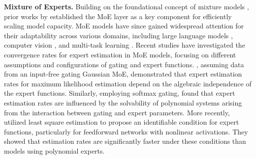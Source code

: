 \textbf{Mixture of Experts.} Building on the foundational concept of mixture models \cite{Jacob_Jordan-1991, jordan1994hierarchical}, prior works by \cite{Eigen_learning_2014, Quoc-conf-2017} established the MoE layer as a key component for efficiently scaling model capacity. MoE models have since gained widespread attention for their adaptability across various domains, including large language models \cite{du2022glam, zhou2023brainformers}, computer vision \cite{riquelme2021scaling, fromsparsetosoft}, and multi-task learning \cite{mmoe}. Recent studies have investigated the convergence rates for expert estimation in MoE models, focusing on different assumptions and configurations of gating and expert functions. \cite{ho2022convergence}, assuming data from an input-free gating Gaussian MoE, demonstrated that expert estimation rates for maximum likelihood estimation depend on the algebraic independence of the expert functions. Similarly, employing softmax gating, \cite{nguyen2023demystifying,nguyen2024temperature} found that expert estimation rates are influenced by the solvability of polynomial systems arising from the interaction between gating and expert parameters. More recently, \cite{nguyen2024squares,nguyen2024sigmoid} utilized least square estimation to propose an identifiable condition for expert functions, particularly for feedforward networks with nonlinear activations. They showed that estimation rates are significantly faster under these conditions than models using polynomial experts.
